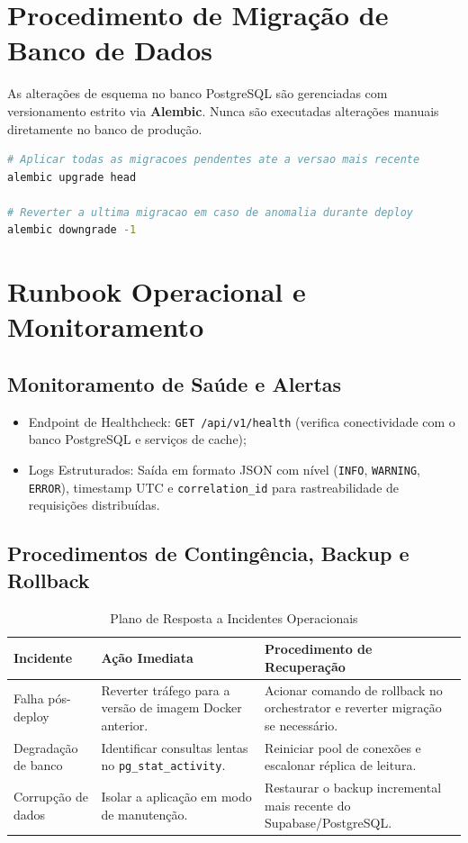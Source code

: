 \section{Procedimento de Migração de Banco de Dados}
As alterações de esquema no banco PostgreSQL são gerenciadas com versionamento estrito via \textbf{Alembic}. Nunca são executadas alterações manuais diretamente no banco de produção.

\begin{lstlisting}[language=bash, caption={Comandos para Migração e Rollback de Banco de Dados}]
# Aplicar todas as migracoes pendentes ate a versao mais recente
alembic upgrade head

# Reverter a ultima migracao em caso de anomalia durante deploy
alembic downgrade -1
\end{lstlisting}

\section{Runbook Operacional e Monitoramento}
\subsection{Monitoramento de Saúde e Alertas}
\begin{itemize}
    \item Endpoint de Healthcheck: \texttt{GET /api/v1/health} (verifica conectividade com o banco PostgreSQL e serviços de cache);
    \item Logs Estruturados: Saída em formato JSON com nível (\texttt{INFO}, \texttt{WARNING}, \texttt{ERROR}), timestamp UTC e \texttt{correlation\_id} para rastreabilidade de requisições distribuídas.
\end{itemize}

\subsection{Procedimentos de Contingência, Backup e Rollback}
\begin{table}[htbp]
\caption{Plano de Resposta a Incidentes Operacionais}
\label{tab:incidentes_runbook}
\centering
\small
\begin{tabularx}{\textwidth}{@{} l Y Y @{}}
\toprule
\textbf{Incidente} & \textbf{Ação Imediata} & \textbf{Procedimento de Recuperação} \\
\midrule
Falha pós-deploy & Reverter tráfego para a versão de imagem Docker anterior. & Acionar comando de rollback no orchestrator e reverter migração se necessário. \\
Degradação de banco & Identificar consultas lentas no \texttt{pg\_stat\_activity}. & Reiniciar pool de conexões e escalonar réplica de leitura. \\
Corrupção de dados & Isolar a aplicação em modo de manutenção. & Restaurar o backup incremental mais recente do Supabase/PostgreSQL. \\
\bottomrule
\end{tabularx}
\end{table}
